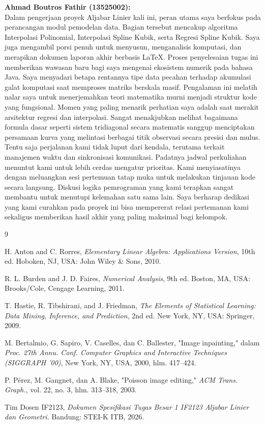 \documentclass[12pt, a4paper]{article}
\begin{document}
\textbf{Ahmad Boutros Fathir (13525002):}\\
Dalam pengerjaan proyek Aljabar Linier kali ini, peran utama saya berfokus pada perancangan modul pemodelan data. Bagian tersebut mencakup algoritma Interpolasi Polinomial, Interpolasi Spline Kubik, serta Regresi Spline Kubik. Saya juga mengambil porsi penuh untuk menyusun, menganalisis komputasi, dan merapikan dokumen laporan akhir berbasis LaTeX. Proses penyelesaian tugas ini memberikan wawasan baru bagi saya mengenai ekosistem numerik pada bahasa Java. Saya menyadari betapa rentannya tipe data pecahan terhadap akumulasi galat komputasi saat memproses matriks berskala masif. Pengalaman ini melatih nalar saya untuk menerjemahkan teori matematika murni menjadi struktur kode yang fungsional. Momen yang paling menarik perhatian saya adalah saat merakit arsitektur regresi dan interpolasi. Sangat menakjubkan melihat bagaimana formula dasar seperti sistem tridiagonal secara matematis sanggup menciptakan persamaan kurva yang melintasi berbagai titik observasi secara presisi dan mulus. Tentu saja perjalanan kami tidak luput dari kendala, terutama terkait manajemen waktu dan sinkronisasi komunikasi. Padatnya jadwal perkuliahan menuntut kami untuk lebih cerdas mengatur prioritas. Kami menyiasatinya dengan meluangkan sesi pertemuan tatap muka untuk melakukan tinjauan kode secara langsung. Diskusi logika pemrograman yang kami terapkan sangat membantu untuk menutupi kelemahan satu sama lain. Saya berharap dedikasi yang kami curahkan pada proyek ini bisa mempererat relasi pertemanan kami sekaligus memberikan hasil akhir yang paling maksimal bagi kelompok.


\begin{thebibliography}{9}

H. Anton and C. Rorres, \textit{Elementary Linear Algebra: Applications Version}, 10th ed. Hoboken, NJ, USA: John Wiley \& Sons, 2010.

R. L. Burden and J. D. Faires, \textit{Numerical Analysis}, 9th ed. Boston, MA, USA: Brooks/Cole, Cengage Learning, 2011.

T. Hastie, R. Tibshirani, and J. Friedman, \textit{The Elements of Statistical Learning: Data Mining, Inference, and Prediction}, 2nd ed. New York, NY, USA: Springer, 2009.

M. Bertalmio, G. Sapiro, V. Caselles, dan C. Ballester, "Image inpainting," dalam \textit{Proc. 27th Annu. Conf. Computer Graphics and Interactive Techniques (SIGGRAPH '00)}, New York, NY, USA, 2000, hlm. 417--424.

P. Pérez, M. Gangnet, dan A. Blake, "Poisson image editing," \textit{ACM Trans. Graph.}, vol. 22, no. 3, hlm. 313--318, 2003.

Tim Dosen IF2123, \textit{Dokumen Spesifikasi Tugas Besar 1 IF2123 Aljabar Linier dan Geometri}. Bandung: STEI-K ITB, 2026.

\end{thebibliography}
\end{document}
